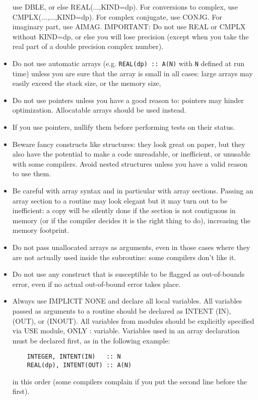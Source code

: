 \documentclass[12pt,a4paper]{article}
\begin{document}
\begin{itemize}
use DBLE, or else REAL(...,KIND=dp). For conversions to complex, use
CMPLX(...,...,KIND=dp). For complex conjugate, use CONJG.  For imaginary part,
use AIMAG.  IMPORTANT: Do not use REAL or CMPLX without KIND=dp, or else you
will lose precision (except when you take the real part of a
double precision complex number).
\item Do not use automatic arrays (e.g. \texttt{REAL(dp) :: A(N)} with
\texttt{N} defined at run time) unless you are sure that the array is
small in all cases: large arrays may easily exceed the stack size,
or the memory size,
\item Do not use pointers unless you have a good reason to:
pointers may hinder optimization. Allocatable arrays should be used instead.
\item If you use pointers, nullify them before performing tests on their
status.
\item Beware fancy constructs like structures: they look great on paper,
but they also have the potential to make a code unreadable, or inefficient,
or unusable with some compilers. Avoid nested structures unless you have a
valid reason to use them.
\item Be careful with array syntax and in particular with
array sections. Passing an array section to a routine may look elegant
but it may turn out to be inefficient: a copy will be silently done
if the section is not contiguous in memory (or if the compiler
decides it is the right thing to do), increasing the memory footprint.
\item Do not pass unallocated arrays as arguments, even in those cases where
they are not actually used inside the subroutine: some compilers don't
like it.
\item Do not use any construct that is susceptible to be flagged as
out-of-bounds error, even if no actual out-of-bound error takes place.
\item Always use IMPLICIT NONE and declare all local variables.
All variables passed as arguments to a routine should be declared as
INTENT (IN), (OUT), or (INOUT). All variables from modules should be
explicitly specified via USE module, ONLY : variable. Variables used
in an array declaration must be declared first, as in the following
example:
\begin{verbatim}
    INTEGER, INTENT(IN)   :: N
    REAL(dp), INTENT(OUT) :: A(N)
\end{verbatim}
in this order (some compilers complain if you put the second line
before the first).
\end{itemize}
\end{document}
